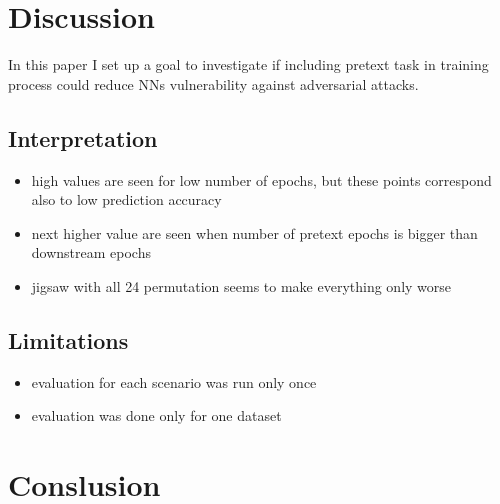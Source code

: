 \section{Discussion}

In this paper I set up a goal to investigate if including pretext task in training process could reduce NNs vulnerability against adversarial attacks.

\subsection{Interpretation}

\begin{itemize}
    \item high values are seen for low number of epochs, but these points correspond also to low prediction accuracy
    \item next higher value are seen when number of pretext epochs is bigger than downstream epochs
    \item jigsaw with all 24 permutation seems to make everything only worse
\end{itemize}

\subsection{Limitations}
\begin{itemize}
    \item evaluation for each scenario was run only once
    \item evaluation was done only for one dataset
\end{itemize}


\section{Conslusion}
